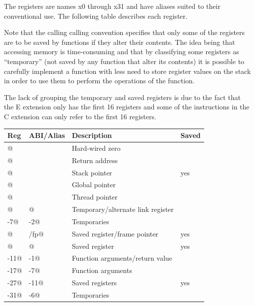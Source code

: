 The registers are names x0 through x31 and have aliases suited to their
conventional use.  The following table describes each register.

Note
that the calling calling convention specifies that only some
of the registers are to be saved by functions if they alter their contents.
The idea being that accessing memory is time-consuming and that by
classifying some registers as ``temporary'' (not saved by any function
that alter its contents) it is possible to carefully implement a function
with less need to store register values on the stack in order to use them
to perform the operations of the function.

The lack of grouping the temporary and saved registers is due to the
fact that the E extension %
only has the first 16 registers
and some of the instructions in the C extension %
can only refer to the first 16 registers.


\begin{center}
\begin{tabular}{|l|l|l|l|}
\hline
Reg		& ABI/Alias	& Description						& Saved		\\
\hline
\hline
\verb@x0@		&	\verb@zero@		& Hard-wired zero					&			\\
\verb@x1@		&	\verb@ra@		& Return address					& 			\\
\verb@x2@		&	\verb@sp@		& Stack pointer						& yes		\\
\verb@x3@		&	\verb@gp@		& Global pointer					&			\\
\verb@x4@		&	\verb@tp@		& Thread pointer					&			\\
\verb@x5@		&	\verb@t0@		& Temporary/alternate link register	&			\\
\verb@x6-7@		&	\verb@t1-2@		& Temporaries						&			\\
\verb@x8@		&	\verb@s0/fp@	& Saved register/frame pointer		& yes		\\
\verb@x9@		&	\verb@s1@		& Saved register					& yes		\\
\verb@x10-11@	&	\verb@a0-1@		& Function arguments/return value	& 			\\
\verb@x12-17@	&	\verb@a2-7@		& Function arguments				& 			\\
\verb@x18-27@	&	\verb@s2-11@	& Saved registers					& yes		\\
\verb@x28-31@	&	\verb@t3-6@		& Temporaries						&			\\
\hline
\end{tabular}
\end{center}

